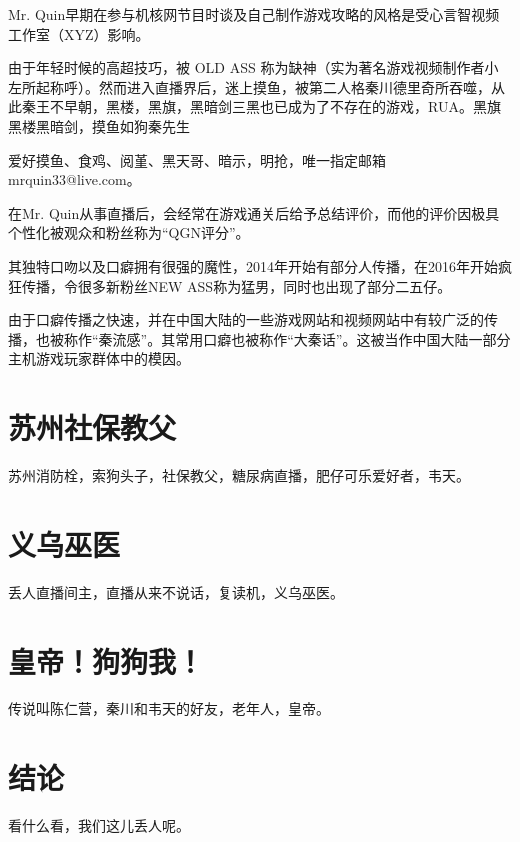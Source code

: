 \documentclass[a4paper,11pt,onecolumn,twoside]{article}
\begin{document}
\begin{multicols}{2}
Mr. Quin早期在参与机核网节目时谈及自己制作游戏攻略的风格是受心言智视频工作室（XYZ）影响。

由于年轻时候的高超技巧，被 OLD ASS 称为缺神（实为著名游戏视频制作者小左所起称呼）。然而进入直播界后，迷上摸鱼，被第二人格秦川德里奇所吞噬，从此秦王不早朝，黑楼，黑旗，黑暗剑三黑也已成为了不存在的游戏，RUA。黑旗黑楼黑暗剑，摸鱼如狗秦先生

爱好摸鱼、食鸡、阅堇、黑天哥、暗示，明抢，唯一指定邮箱mrquin33@live.com。

在Mr. Quin从事直播后，会经常在游戏通关后给予总结评价，而他的评价因极具个性化被观众和粉丝称为“QGN评分”。

其独特口吻以及口癖拥有很强的魔性，2014年开始有部分人传播，在2016年开始疯狂传播，令很多新粉丝NEW ASS称为猛男，同时也出现了部分二五仔。

由于口癖传播之快速，并在中国大陆的一些游戏网站和视频网站中有较广泛的传播，也被称作“秦流感”。其常用口癖也被称作“大秦话”。这被当作中国大陆一部分主机游戏玩家群体中的模因。

\section{苏州社保教父}
苏州消防栓，索狗头子，社保教父，糖尿病直播，肥仔可乐爱好者，韦天。


\section{义乌巫医}
丢人直播间主，直播从来不说话，复读机，义乌巫医。


\section{皇帝！狗狗我！}
传说叫陈仁营，秦川和韦天的好友，老年人，皇帝。


\section{结论}
看什么看，我们这儿丢人呢。





\end{multicols}

\clearpage
\end{document}
